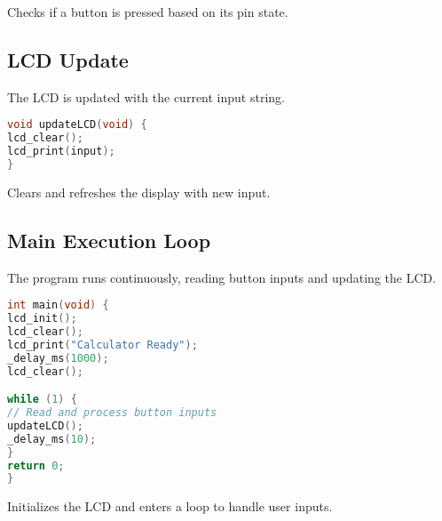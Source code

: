 Checks if a button is pressed based on its pin state.

\subsection{LCD Update}
The LCD is updated with the current input string.
\begin{lstlisting}[language=C]
void updateLCD(void) {
lcd_clear();
lcd_print(input);
}
\end{lstlisting}

Clears and refreshes the display with new input.

\subsection{Main Execution Loop}
The program runs continuously, reading button inputs and updating the LCD.
\begin{lstlisting}[language=C]
int main(void) {
lcd_init();
lcd_clear();
lcd_print("Calculator Ready");
_delay_ms(1000);
lcd_clear();

while (1) {
// Read and process button inputs
updateLCD();
_delay_ms(10);
}
return 0;
}
\end{lstlisting}

Initializes the LCD and enters a loop to handle user inputs.
\newpage